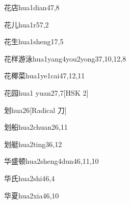 \begin{entry}{花店}{hua1dian4}{7,8}
\end{entry}

\begin{entry}{花儿}{hua1r5}{7,2}
\end{entry}

\begin{entry}{花生}{hua1sheng1}{7,5}
\end{entry}

\begin{entry}{花样游泳}{hua1yang4you2yong3}{7,10,12,8}
\end{entry}

\begin{entry}{花椰菜}{hua1ye1cai4}{7,12,11}
\end{entry}

\begin{entry}{花园}{hua1 yuan2}{7,7}[HSK 2]
\end{entry}

\begin{entry}{划}{hua2}{6}[Radical 刀]
\end{entry}

\begin{entry}{划船}{hua2chuan2}{6,11}
\end{entry}

\begin{entry}{划艇}{hua2ting3}{6,12}
\end{entry}

\begin{entry}{华盛顿}{hua2sheng4dun4}{6,11,10}
\end{entry}

\begin{entry}{华氏}{hua2shi4}{6,4}
\end{entry}

\begin{entry}{华夏}{hua2xia4}{6,10}
\end{entry}

